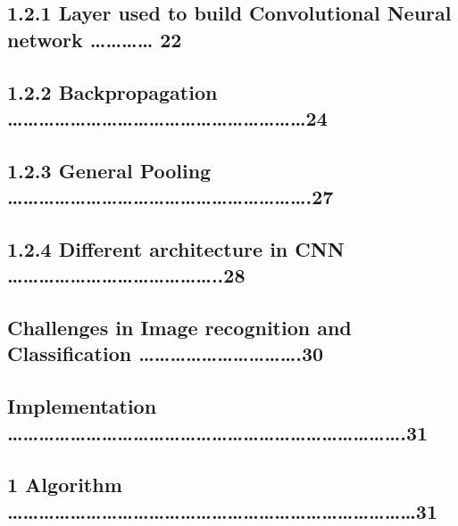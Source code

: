 \documentclass{article} %
\begin{document}
\noindent 
\subsection{               1.2.1 Layer used to build Convolutional Neural network  {\dots}{\dots}{\dots}{\dots}   22}

\noindent 
\subsection{               1.2.2 Backpropagation {\dots}{\dots}{\dots}{\dots}{\dots}{\dots}{\dots}{\dots}{\dots}{\dots}{\dots}{\dots}{\dots}{\dots}{\dots}{\dots}{\dots}{\dots}{\dots}24}

\noindent 
\subsection{               1.2.3 General Pooling  {\dots}{\dots}{\dots}{\dots}{\dots}{\dots}{\dots}{\dots}{\dots}{\dots}{\dots}{\dots}{\dots}{\dots}{\dots}{\dots}{\dots}{\dots}{\dots}.27}

\noindent 
\subsection{               1.2.4 Different architecture in CNN {\dots}{\dots}{\dots}{\dots}{\dots}{\dots}{\dots}{\dots}{\dots}{\dots}{\dots}{\dots}{\dots}..28}

\noindent 
\subsection{ Challenges in Image recognition and Classification {\dots}{\dots}{\dots}{\dots}{\dots}{\dots}{\dots}{\dots}{\dots}{\dots}.30}

\noindent 
\subsection{Implementation {\dots}{\dots}{\dots}{\dots}{\dots}{\dots}{\dots}{\dots}{\dots}{\dots}{\dots}{\dots}{\dots}{\dots}{\dots}{\dots}{\dots}{\dots}{\dots}{\dots}{\dots}{\dots}{\dots}{\dots}{\dots}.31}

\noindent 
\subsection{     1 Algorithm {\dots}{\dots}{\dots}{\dots}{\dots}{\dots}{\dots}{\dots}{\dots}{\dots}{\dots}{\dots}{\dots}{\dots}{\dots}{\dots}{\dots}{\dots}{\dots}{\dots}{\dots}{\dots}{\dots}{\dots}{\dots}{\dots}31}
\end{document}
